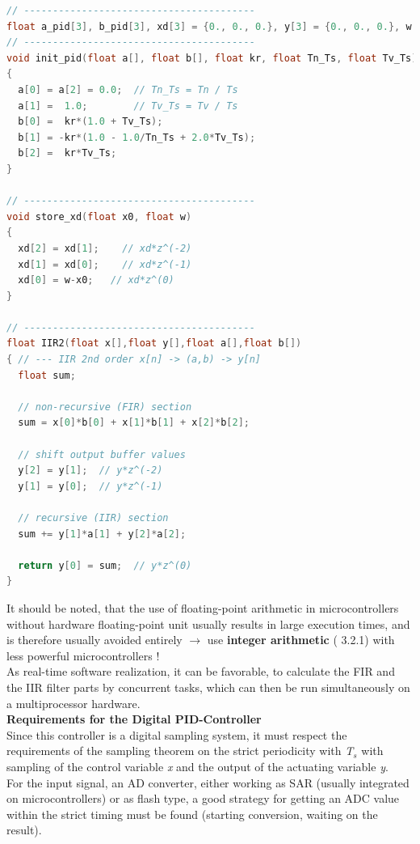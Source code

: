 \begin{lstlisting}[style=mystyle, language=c]
// ----------------------------------------
float a_pid[3], b_pid[3], xd[3] = {0., 0., 0.}, y[3] = {0., 0., 0.}, w = 0.;
// ----------------------------------------
void init_pid(float a[], float b[], float kr, float Tn_Ts, float Tv_Ts)
{
  a[0] = a[2] = 0.0;  // Tn_Ts = Tn / Ts
  a[1] =  1.0;        // Tv_Ts = Tv / Ts
  b[0] =  kr*(1.0 + Tv_Ts);
  b[1] = -kr*(1.0 - 1.0/Tn_Ts + 2.0*Tv_Ts);
  b[2] =  kr*Tv_Ts;
}

// ----------------------------------------
void store_xd(float x0, float w)
{
  xd[2] = xd[1];    // xd*z^(-2)
  xd[1] = xd[0];    // xd*z^(-1)
  xd[0] = w-x0;   // xd*z^(0)
}

// ----------------------------------------
float IIR2(float x[],float y[],float a[],float b[])
{ // --- IIR 2nd order x[n] -> (a,b) -> y[n] 
  float sum;

  // non-recursive (FIR) section
  sum = x[0]*b[0] + x[1]*b[1] + x[2]*b[2];

  // shift output buffer values
  y[2] = y[1];  // y*z^(-2)
  y[1] = y[0];  // y*z^(-1)

  // recursive (IIR) section
  sum += y[1]*a[1] + y[2]*a[2];

  return y[0] = sum;  // y*z^(0)
}
\end{lstlisting}

It should be noted, that the use of floating-point arithmetic in microcontrollers without hardware floating-point unit usually results in large execution times, and is therefore usually avoided entirely $\rightarrow$ use \textbf{integer arithmetic} ( 3.2.1) with less powerful microcontrollers !\\

As real-time software realization, it can be favorable, to calculate the FIR and the IIR filter parts by concurrent tasks, which can then be run simultaneously on a multiprocessor hardware.\\

{\rot\bf Requirements for the Digital PID-Controller}\\

Since this controller is a digital sampling system, it must respect the requirements of the sampling theorem on the strict periodicity with \textit{T${}_{s}$} with sampling of the control variable \textit{x} and the output of the actuating variable \textit{y}. \\

For the input signal, an AD converter, either working as SAR (usually integrated on microcontrollers) or as flash type, a good strategy for getting an ADC value within the strict timing must be found (starting conversion, waiting on the result).

